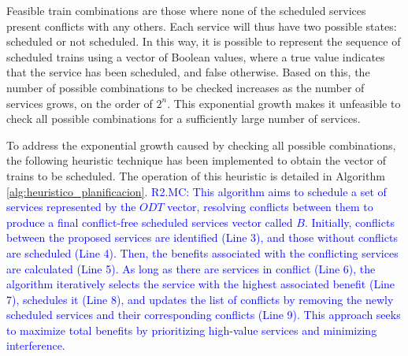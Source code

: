 \documentclass[Afour,sagev,times]{sagej}
\newcommand{\segundo}[1]{\textcolor{blue}{#1}}
\begin{document}
Feasible train combinations are those where none of the scheduled services present conflicts with any others. Each service will thus have two possible states: scheduled or not scheduled. In this way, it is possible to represent the sequence of scheduled trains using a vector of Boolean values, where a true value indicates that the service has been scheduled, and false otherwise. Based on this, the number of possible combinations to be checked increases as the number of services grows, on the order of $2^n$. This exponential growth makes it unfeasible to check all possible combinations for a sufficiently large number of services.

To address the exponential growth caused by checking all possible combinations, the following heuristic technique has been implemented to obtain the vector of trains to be scheduled. The operation of this heuristic is detailed in Algorithm \ref{alg:heuristico_planificacion}. \segundo{R2.MC: This algorithm aims to schedule a set of services represented by the $ODT$ vector, resolving conflicts between them to produce a final conflict-free scheduled services vector called $B$. Initially, conflicts between the proposed services are identified (Line 3), and those without conflicts are scheduled (Line 4). Then, the benefits associated with the conflicting services are calculated (Line 5). As long as there are services in conflict (Line 6), the algorithm iteratively selects the service with the highest associated benefit (Line 7), schedules it (Line 8), and updates the list of conflicts by removing the newly scheduled services and their corresponding conflicts (Line 9). This approach seeks to maximize total benefits by prioritizing high-value services and minimizing interference.}

\end{document}
